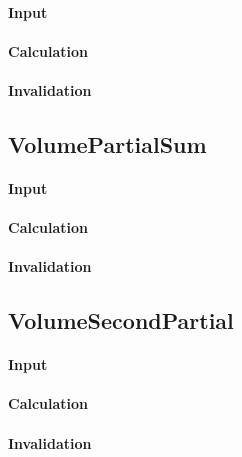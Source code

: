 \paragraph{Input}

\paragraph{Calculation}

\paragraph{Invalidation}

\bigskip

\subsection{VolumePartialSum}

\paragraph{Input}

\paragraph{Calculation}

\paragraph{Invalidation}

\bigskip

\subsection{VolumeSecondPartial}

\paragraph{Input}

\paragraph{Calculation}

\paragraph{Invalidation}

\bigskip

